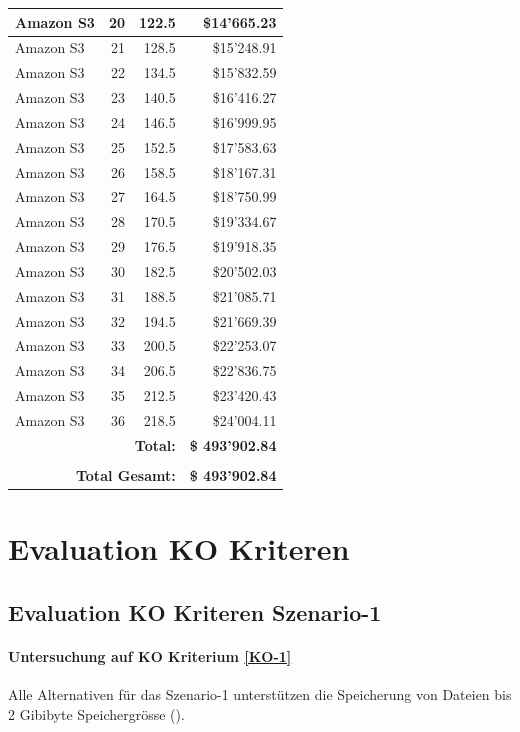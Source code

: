 \begin{table}
\begin{center}
\begin{tabular}{|l|r|r|r|}
Amazon S3 & 20 & 122.5 &  \$14'665.23  \\ \hline
Amazon S3 & 21 & 128.5 &  \$15'248.91  \\ \hline
Amazon S3 & 22 & 134.5 &  \$15'832.59  \\ \hline
Amazon S3 & 23 & 140.5 &  \$16'416.27  \\ \hline
Amazon S3 & 24 & 146.5 &  \$16'999.95  \\ \hline
Amazon S3 & 25 & 152.5 &  \$17'583.63  \\ \hline
Amazon S3 & 26 & 158.5 &  \$18'167.31  \\ \hline
Amazon S3 & 27 & 164.5 &  \$18'750.99  \\ \hline
Amazon S3 & 28 & 170.5 &  \$19'334.67  \\ \hline
Amazon S3 & 29 & 176.5 &  \$19'918.35  \\ \hline
Amazon S3 & 30 & 182.5 &  \$20'502.03  \\ \hline
Amazon S3 & 31 & 188.5 &  \$21'085.71  \\ \hline
Amazon S3 & 32 & 194.5 &  \$21'669.39  \\ \hline
Amazon S3 & 33 & 200.5 &  \$22'253.07  \\ \hline
Amazon S3 & 34 & 206.5 &  \$22'836.75  \\ \hline
Amazon S3 & 35 & 212.5 &  \$23'420.43  \\ \hline
Amazon S3 & 36 & 218.5 &  \$24'004.11  \\ \hline
\multicolumn{3}{r|}{\textbf{Total:}} & \textbf{\$ 493'902.84}
 \\ \cline{4-4}
\multicolumn{4}{c}{} \\  \cline{4-4}
\multicolumn{3}{r|}{\textbf{Total Gesamt:}} & \textbf{\$ 493'902.84}
 \\ \cline{4-4}
\end{tabular}
\end{center}
\label{tab:KostenAmazonS3S2}
\end{table}




\section{Evaluation KO Kriteren}
\subsection{Evaluation KO Kriteren Szenario-1}

\paragraph*{Untersuchung auf KO Kriterium \ref{KO-1}}
Alle Alternativen für das Szenario-1 unterstützen die Speicherung von Dateien bis 2 Gibibyte Speichergrösse ().

